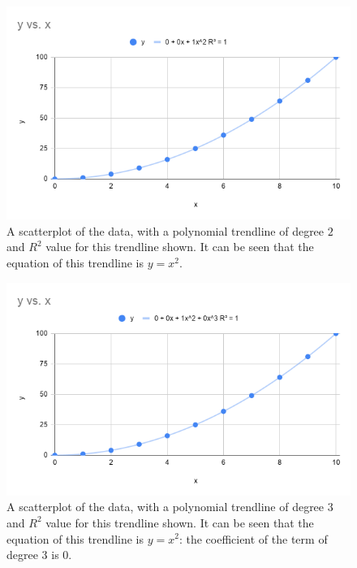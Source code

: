 \documentclass[12pt]{article}
\begin{document}
\begin{figure}[p]
\includegraphics[width=6.5in]{q1graphpoly2.png}
\caption{A scatterplot of the data, with a polynomial trendline of degree $2$ and $R^2$ value for this trendline shown. It can be seen that the equation of this trendline is $y=x^2$.}
\label{fig:q1poly2}
\end{figure}

\begin{figure}[p]
\includegraphics[width=6.5in]{q1graphpoly3.png}
\caption{A scatterplot of the data, with a polynomial trendline of degree $3$ and $R^2$ value for this trendline shown. It can be seen that the equation of this trendline is $y=x^2$: the coefficient of the term of degree $3$ is $0$.}
\label{fig:q1poly3}
\end{figure}
\end{document}
